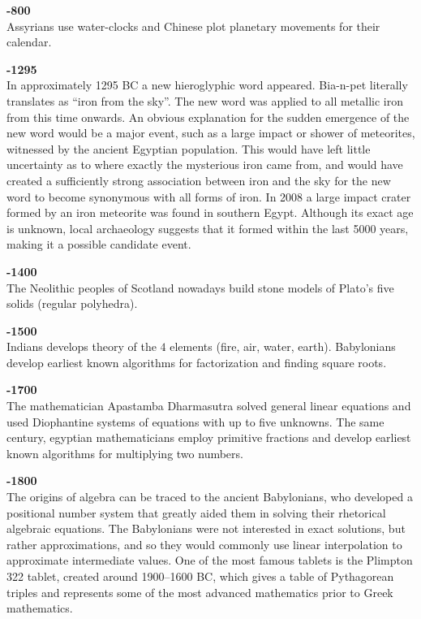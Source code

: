 \textbf{-800}\\
Assyrians use water-clocks and Chinese plot planetary movements for their calendar.

\textbf{-1295}\\
In approximately 1295 BC a new hieroglyphic word appeared. Bia-n-pet literally translates as “iron from the sky”. The new word was applied to all metallic iron from this time onwards. An obvious explanation for the sudden emergence of the new word would be a major event, such as a large impact or shower of meteorites, witnessed by the ancient Egyptian population. This would have left little uncertainty as to where exactly the mysterious iron came from, and would have created a sufficiently strong association between iron and the sky for the new word to become synonymous with all forms of iron. In 2008 a large impact crater formed by an iron meteorite was found in southern Egypt. Although its exact age is unknown, local archaeology suggests that it formed within the last 5000 years, making it a possible candidate event. 

\textbf{-1400}\\
The Neolithic peoples of Scotland nowadays build stone models of Plato's five solids (regular polyhedra).

\textbf{-1500}\\
Indians develops theory of the $4$ elements (fire, air, water, earth). Babylonians develop earliest known algorithms for factorization and finding square roots. 

\textbf{-1700}\\
The mathematician Apastamba Dharmasutra solved general linear equations and used Diophantine systems of equations with up to five unknowns. The same century, egyptian mathematicians employ primitive fractions and develop earliest known algorithms for multiplying two numbers. 

\textbf{-1800}\\
The origins of algebra can be traced to the ancient Babylonians, who developed a positional number system that greatly aided them in solving their rhetorical algebraic equations. The Babylonians were not interested in exact solutions, but rather approximations, and so they would commonly use linear interpolation to approximate intermediate values. One of the most famous tablets is the Plimpton 322 tablet, created around 1900–1600 BC, which gives a table of Pythagorean triples and represents some of the most advanced mathematics prior to Greek mathematics.

